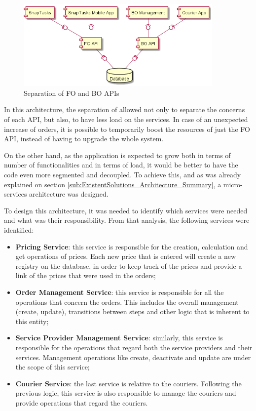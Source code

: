 \begin{figure}[!hb]
\centering
\includegraphics[width=0.9\textwidth,keepaspectratio]{chapters/Architectural_Overview/assets/BoFoSepartion.png}
\caption[Separation of FO and BO APIs]{Separation of FO and BO APIs}
\label{fig:foBoSeparation}
\end{figure}

\par
In this architecture, the separation of allowed not only to separate the concerns of each \gls{API}, but also, to have less load on the services. In case of an unexpected increase of orders, it is possible to temporarily boost the resources of just the FO API, instead of having to upgrade the whole system.
\par
On the other hand, as the application is expected to grow both in terms of number of functionalities and in terms of load, it would be better to have the code even more segmented and decoupled. To achieve this, and as was already explained on section \ref{sub:ExistentSolutions_Architecture_Summary}, a micro-services architecture was designed. 
\par
To design this architecture, it was needed to identify which services were needed and what was their responsibility. From that analysis, the following services were identified: 

\begin{itemize}
  \item \textbf{Pricing Service}: this service is responsible for the creation, calculation and get operations of prices. Each new price that is entered will create a new registry on the database, in order to keep track of the prices and provide a link of the prices that were used in the orders;
  \item \textbf{Order Management Service}: this service is responsible for all the operations that concern the orders. This includes the overall management (create, update), transitions between steps and other logic that is inherent to this entity;
  \item \textbf{Service Provider Management Service}: similarly, this service is responsible for the operations that regard both the service providers and their services. Management operations like create, deactivate and update are under the scope of this service;
  \item \textbf{Courier Service}: the last service is relative to the couriers. Following the previous logic, this service is also responsible to manage the couriers and provide operations that regard the couriers.
\end{itemize}

